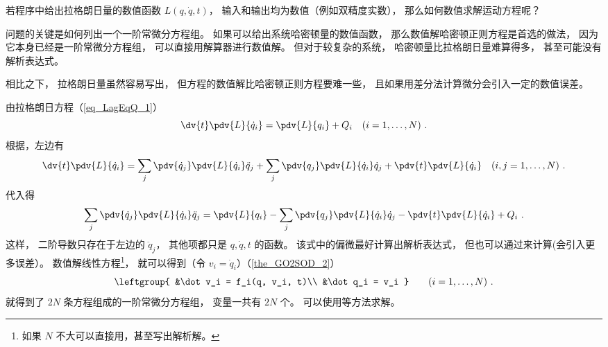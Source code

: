 
\begin{issues}
\issueDraft
\end{issues}


若程序中给出拉格朗日量的数值函数 $L(q, \dot q, t)$， 输入和输出均为数值（例如双精度实数）， 那么如何数值求解运动方程呢？

问题的关键是如何列出一个一阶常微分方程组。 如果可以给出系统哈密顿量的数值函数， 那么数值解哈密顿正则方程是首选的做法， 因为它本身已经是一阶常微分方程组， 可以直接用解算器进行数值解。 但对于较复杂的系统， 哈密顿量比拉格朗日量难算得多， 甚至可能没有解析表达式。

相比之下， 拉格朗日量虽然容易写出， 但方程的数值解比哈密顿正则方程要难一些， 且如果用差分法计算微分会引入一定的数值误差。

由拉格朗日方程（\autoref{eq_LagEqQ_1}）
\begin{equation}
\dv{t} \pdv{L}{\dot q_i} = \pdv{L}{q_i} + Q_i
\quad (i=1,\dots,N)~.
\end{equation}
根据，左边有
\begin{equation}
\dv{t} \pdv{L}{\dot q_i} = \sum_j\pdv{\dot q_j}\pdv{L}{\dot q_i}\ddot q_j + \sum_j\pdv{q_j}\pdv{L}{\dot q_i}\dot q_j + \pdv{t}\pdv{L}{\dot q_i} \quad (i,j=1,\dots,N)~.
\end{equation}
代入得
\begin{equation}
\sum_j\pdv{\dot q_j}\pdv{L}{\dot q_i}\ddot q_j = \pdv{L}{q_i} - \sum_j\pdv{q_j}\pdv{L}{\dot q_i}\dot q_j - \pdv{t}\pdv{L}{\dot q_i} + Q_i~.
\end{equation}
这样， 二阶导数只存在于左边的 $\ddot q_j$， 其他项都只是 $q,\dot q, t$ 的函数。 该式中的偏微最好计算出解析表达式， 但也可以通过来计算(会引入更多误差）。 数值解线性方程\footnote{如果 $N$ 不大可以直接用，甚至写出解析解。}， 就可以得到（令 $v_i = \dot q_i$）（\autoref{the_GO2SOD_2}）
\begin{equation}
\leftgroup{
&\dot v_i = f_i(q, v_i, t)\\
&\dot q_i = v_i
}\qquad (i = 1,\dots,N)~.
\end{equation}
就得到了 $2N$ 条方程组成的一阶常微分方程组， 变量一共有 $2N$ 个。 可以使用等方法求解。

